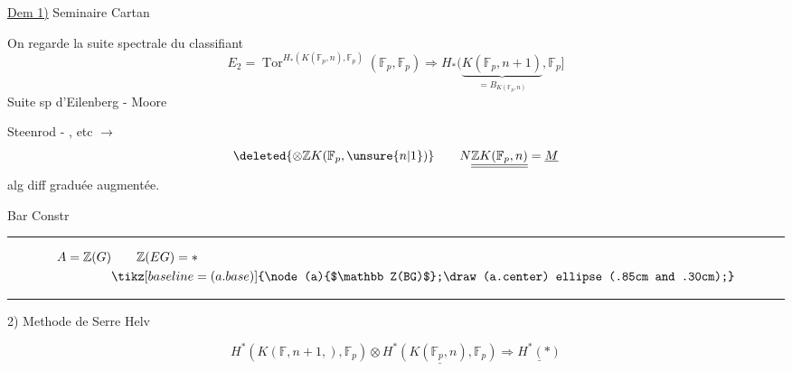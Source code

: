 \uline{Dem 1)} Seminaire Cartan

On regarde la suite spectrale du classifiant
\[
E_2=\operatorname{Tor}^{H_{*}(K(\mathbb F_p,n),\mathbb F_p)}
(\mathbb F_p,\mathbb F_p)\Longrightarrow H_{*}(\underbrace{K(\mathbb F_p,n+1)}_{\displaystyle =B_{K(\mathbb F_p,n)}},\mathbb F_p]
\]
Suite sp d'Eilenberg - Moore

Steenrod - , etc $\longrightarrow$
\[
\deleted{\otimes\mathbb Z K(\mathbb F_p,\unsure{n|1})}
\qquad N\underline{\underline{\mathbb Z K(\mathbb F_p,n)}}=\underline M
\]
alg diff graduée augmentée.

Bar Constr
\begin{center}\rule{2.2cm}{0.3pt}\end{center}
\[
\begin{aligned}
A=\mathbb Z(G)&\qquad\mathbb Z(EG)=*\\
&\tikz[baseline=(a.base)]{\node(a){$\mathbb Z(BG)$};\draw(a.center) ellipse (.85cm and .30cm);}
\end{aligned}
\]
\begin{center}\rule{3cm}{0.3pt}\end{center}

2) Methode de Serre \quad {} Helv 

\[
H^{*}(K(\mathbb F,n+1,),\mathbb F_p)\otimes
\underline{H^{*}(K(\mathbb F_p,n),\mathbb F_p)}\Longrightarrow\underline{H^{*}(*)}
\]
